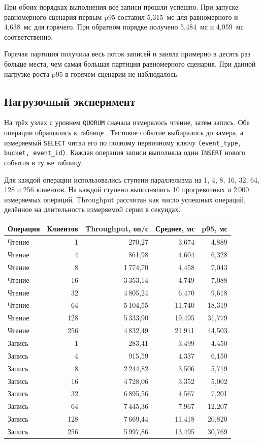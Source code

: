 \documentclass[12pt,a4paper]{article}
\renewcommand{\arraystretch}{1.18}
\begin{document}
При обоих порядках выполнения все записи прошли успешно. При запуске равномерного сценария первым p95 составил 5,315~мс для равномерного и 4,638~мс для горячего. При обратном порядке получено 5,484~мс и 4,959~мс соответственно.

Горячая партиция получила весь поток записей и заняла примерно в десять раз больше места, чем самая большая партиция равномерного сценария. При данной нагрузке роста p95 в горячем сценарии не наблюдалось. 

\clearpage
\subsection{Нагрузочный эксперимент}

На трёх узлах с уровнем \texttt{QUORUM} сначала измерялось чтение, затем запись. Обе операции обращались к таблице . Тестовое событие выбиралось до замера, а измеряемый \texttt{SELECT} читал его по полному первичному ключу \texttt{(event\_type, bucket, event\_id)}. Каждая операция записи выполняла один \texttt{INSERT} нового события в ту же таблицу.

Для каждой операции использовались ступени параллелизма на 1, 4, 8, 16, 32, 64, 128 и 256 клиентов. На каждой ступени выполнялись 10 прогревочных и 2\,000 измеряемых операций. Throughput рассчитан как число успешных операций, делённое на длительность измеряемой серии в секундах.

\begin{center}
\small
\renewcommand{\arraystretch}{1.08}
\begin{tabular}{@{}lrrrr@{}}
\toprule
Операция & Клиентов & Throughput, оп/с & Среднее, мс & p95, мс \\
\midrule
Чтение & 1 & 270,27 & 3,674 & 4,889 \\
Чтение & 4 & 861,98 & 4,604 & 6,328 \\
Чтение & 8 & 1\,774,70 & 4,458 & 7,043 \\
Чтение & 16 & 3\,353,14 & 4,749 & 7,088 \\
Чтение & 32 & 4\,805,24 & 6,470 & 9,618 \\
Чтение & 64 & 5\,104,55 & 11,740 & 18,319 \\
Чтение & 128 & 5\,333,90 & 19,495 & 31,779 \\
Чтение & 256 & 4\,832,49 & 21,911 & 44,503 \\
\addlinespace
Запись & 1 & 283,41 & 3,499 & 4,450 \\
Запись & 4 & 915,59 & 4,337 & 6,150 \\
Запись & 8 & 2\,244,82 & 3,506 & 5,719 \\
Запись & 16 & 4\,728,06 & 3,352 & 5,002 \\
Запись & 32 & 6\,895,56 & 4,567 & 7,201 \\
Запись & 64 & 7\,445,36 & 7,967 & 12,207 \\
Запись & 128 & 7\,669,44 & 11,418 & 20,820 \\
Запись & 256 & 5\,997,86 & 13,495 & 30,769 \\
\bottomrule
\end{tabular}
\end{center}
\end{document}
